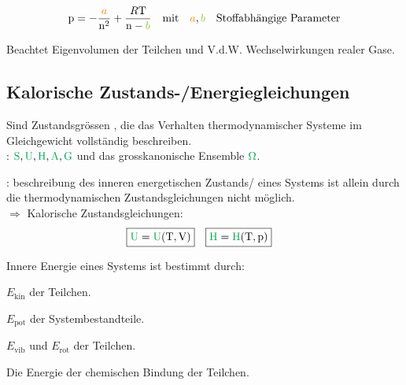 \begin{lawbox}\nospacing
  \begin{law}
    \begin{align}
      &\pz=-\frac{\mca}{\nz^2}+\frac{\Rc\Tz}{\nz-\mcb}&\text{mit}&& \mca,\mcb\quad \text{Stoffabhängige Parameter}
    \end{align}
  \end{law}
\end{lawbox}
\begin{notebox}[Verbesserung]
  Beachtet Eigenvolumen der Teilchen und V.d.W. Wechselwirkungen realer Gase.
\end{notebox}
\subsection{Kalorische Zustands-/Energiegleichungen}
\label{subsec:Kalorische_Zustandsgleichungen/Energiegleichungen}
\begin{defnbox}
  \begin{defn}
    Sind Zustandsgrössen , die das Verhalten thermodynamischer Systeme im Gleichgewicht
    vollständig beschreiben.\\
    : $\Spot,\Upot,\Hpot,\Apot,\Gpot$ und das grosskanonische Ensemble $\Opot$.
  \end{defn}
\end{defnbox}
\begin{sectionbox}\nospacing
  : beschreibung des inneren energetischen Zustands/ eines Systems ist
  allein durch die \textcolor{section}{thermodynamischen Zustandsgleichungen} nicht möglich.\\
  $\Rightarrow$ Kalorische Zustandsgleichungen:
  \begin{align}
    &\boxed{\Upot=\Upot(\Tz,\Vz)}&&\boxed{\Hpot=\Hpot(\Tz,\pz)}
  \end{align}
\end{sectionbox}
\begin{sectionbox}\nospacing
    Innere Energie eines Systems ist bestimmt durch:
    \begin{numberlist}
      \item  $E_{\text{kin}}$ der Teilchen.
      \item  $E_{\text{pot}}$ der Systembestandteile.
      \item  $E_{\text{vib}}$ und $E_{\text{rot}}$ der Teilchen.
      \item Die Energie der chemischen Bindung der Teilchen.
    \end{numberlist}
\end{sectionbox}
